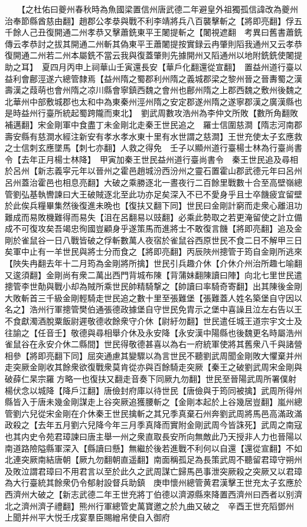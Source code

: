 　　【之杜佑曰夔州春秋時為魚國梁置信州唐武德二年避皇外祖獨孤信諱改為夔州治奉節縣酋慈由翻】趙郡公孝㳟與戰不利李靖將兵八百襲擊斬之【將即亮翻】俘五千餘人己丑復開通二州孝恭又擊蕭銑東平王闍提斬之【闍視遮翻　考異曰舊書蕭銑傳云孝恭討之拔其開通二州斬其偽東平王蕭闍提按實録云冉肇則䧟我通州又云孝恭復開通二州若二州本屬銑不當云我與復蓋肇則先據開州又䧟通州以地附銑銑使闍提助之耳】　夏四月丙申上祠華山壬寅還長安【華戶化翻還從宣翻】　置益州道行臺以益利會鄜涇遂六總管隸焉【益州隋之蜀郡利州隋之義城郡梁之黎州晉之晉夀蜀之漢壽漢之葭萌也會州隋之凉川縣會寧鎮西魏之會州也鄜州隋之上郡西魏之敷州後魏之北華州中部敷城郡也太和中為東秦州涇州隋之安定郡遂州隋之遂寧郡漢之廣漢縣也是時益州行臺所統起蜀跨隴而東北】　劉武周數攻浩州為李仲文所敗【數所角翻敗補邁翻】宋金剛軍中食盡丁未金剛北走秦王世民追之　羅士信圍慈澗【隋志河南郡壽安縣有慈澗水經注新安有孝水孝水東十里有水世謂之慈澗】王世充使太子玄應救之士信刺玄應墜馬【刺七亦翻】人救之得免　壬子以顯州道行臺楊士林為行臺尚書令【去年正月楊士林降】　甲寅加秦王世民益州道行臺尚書令　秦王世民追及尋相於呂州【新志義寜元年以晉州之霍邑趙城汾西汾州之靈石置霍山郡武德元年曰呂州呂州蓋治霍邑也相息亮翻】大破之乘勝逐北一晝夜行二百餘里戰數十合至高壁嶺總管劉弘基執轡諫曰大王破賊逐北至此功亦足矣深入不已不愛身乎且士卒饑疲宜留壁於此俟兵糧畢集然後復進未晩也【復扶又翻下同】世民曰金剛計窮而走衆心離沮功難成而易敗機難得而易失【沮在呂翻易以豉翻】必乘此勢取之若更淹留使之計立備成不可復攻矣吾竭忠徇國豈顧身乎遂策馬而進將士不敢復言饑【將即亮翻】追及金剛於雀鼠谷一日八戰皆破之俘斬數萬人夜宿於雀鼠谷西原世民不食二日不解甲三日矣軍中止有一羊世民與將士分而食之【將即亮翻】丙辰陜州摠管于筠自金剛所逃來【陜失冉翻去年十二月筠為金剛將所擒】世民引兵趣介休【介休介州治所趣七喻翻又逡須翻】金剛尚有衆二萬出西門背城布陳【背蒲妹翻陳讀曰陣】向北七里世民遣摠管李世勣與戰小却為賊所乘世民帥精騎撃之【帥讀曰率騎奇寄翻】出其陳後金剛大敗斬首三千級金剛輕騎走世民追之數十里至張難堡【張難蓋人姓名築堡自守因以名之】浩州行軍摠管樊伯通張德政據堡自守世民免胄示之堡中喜譟且泣左右告以王不食獻濁酒脫粟飯尉遲敬德收餘衆守介休【尉紆勿翻】世民遣任城王道宗宇文士及往諭之【任音壬】敬德與尋相舉介休及永安降【永安漢中陽縣也後魏更名時屬浩州雀鼠谷在永安介休二縣間】世民得敬德甚喜以為右一府統軍使將其舊衆八千與諸營相參【將即亮翻下同】屈突通慮其變驟以為言世民不聽劉武周聞金剛敗大懼棄并州走突厥金剛收其餘衆欲復戰衆莫肯從亦與百餘騎走突厥【秦王之破劉武周宋金剛與破薛仁杲宗羅方略一也復扶又翻走音奏下同厥九勿翻】世民至晉陽武周所署僕射楊伏念以城降【降戶江翻】唐儉封府庫以待世民【唐儉與于筠同被擒】武周所得州縣皆入于唐未幾金剛謀走上谷突厥追獲腰斬之【金剛本起於上谷幾居豈翻】嵐州總管劉六兒從宋金剛在介休秦王世民擒斬之其兄季真棄石州奔劉武周將馬邑高滿政滿政殺之【去年五月劉六兒降今年三月季真降而實附金剛武周今皆誅死】武周之南寇也其内史令苑君璋諫曰唐主舉一州之衆直取長安所向無敵此乃天授非人力也晉陽以南道路險隘縣軍深入【縣讀曰懸】無繼於後若進戰不利何以自還【還從宣翻】不如北連突厥南結唐朝【厥九勿翻朝直遥翻】南面稱孤足為長策武周不聽留君璋守朔州及敗泣謂君璋曰不用君言以至於此久之武周謀亡歸馬邑事泄突厥殺之突厥又以君璋為大行臺統其餘衆仍令郁射設督兵助鎮　庚申懷州總管黄君漢擊王世充太子玄應於西濟州大破之【新志武德二年王世充將丁伯德以濟源縣來降置西濟州曰西者以别濟北之濟州濟子禮翻】熊州行軍總管史萬寶邀之於九曲又破之　辛酉王世充䧟鄧州　上聞并州平大悦壬戌宴羣臣賜繒帛使自入御府